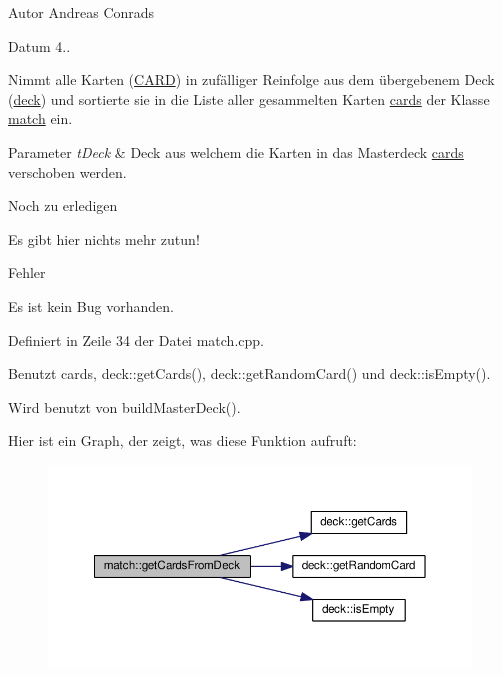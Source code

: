 \begin{DoxyAuthor}{Autor}
Andreas Conrads 
\end{DoxyAuthor}
\begin{DoxyDate}{Datum}
4..
\end{DoxyDate}
Nimmt alle Karten (\hyperlink{struct_c_a_r_d}{C\-A\-R\-D}) in zufälliger Reinfolge aus dem übergebenem Deck (\hyperlink{classdeck}{deck}) und sortierte sie in die Liste aller gesammelten Karten \hyperlink{classmatch_afe9f4e5f94c2c9873db6640281e12dcf}{cards} der Klasse \hyperlink{classmatch}{match} ein. 
\begin{DoxyParams}{Parameter}
{\em t\-Deck} & Deck aus welchem die Karten in das Masterdeck \hyperlink{classmatch_afe9f4e5f94c2c9873db6640281e12dcf}{cards} verschoben werden. \\
\hline
\end{DoxyParams}
\begin{DoxyRefDesc}{Noch zu erledigen}
\item[\hyperlink{todo__todo000001}{Noch zu erledigen}]Es gibt hier nichts mehr zutun! \end{DoxyRefDesc}
\begin{DoxyRefDesc}{Fehler}
\item[\hyperlink{bug__bug000001}{Fehler}]Es ist kein Bug vorhanden. \end{DoxyRefDesc}


Definiert in Zeile 34 der Datei match.\-cpp.



Benutzt cards, deck\-::get\-Cards(), deck\-::get\-Random\-Card() und deck\-::is\-Empty().



Wird benutzt von build\-Master\-Deck().



Hier ist ein Graph, der zeigt, was diese Funktion aufruft\-:\nopagebreak
\begin{figure}[H]
\begin{center}
\leavevmode
\includegraphics[width=350pt]{db/d43/classmatch_a690fc86b621fdd5367a35376fc85130a_cgraph}
\end{center}
\end{figure}




